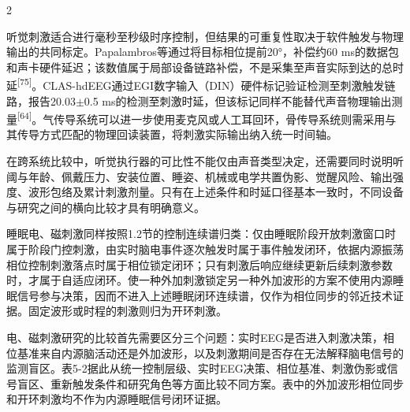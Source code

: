 \documentclass[UTF8,zihao=5,fontset=none]{ctexart}
\newcommand{\hei}{\CJKfamily{hei}}
\newcommand{\leveltwo}[1]{%
  \par\noindent{\hei\fontsize{10.5pt}{15.6pt}\selectfont\bfseries #1\par}}
\newcommand{\refcite}[1]{\nolinebreak[4]\textsuperscript{[#1]}}
\begin{document}
\begin{multicols}{2}

听觉刺激适合进行毫秒至秒级时序控制，但结果的可重复性取决于软件触发与物理输出的共同标定。Papalambros等通过将目标相位提前20°，补偿约60 ms的数据包和声卡硬件延迟；该数值属于局部设备链路补偿，不是采集至声音实际到达的总时延\refcite{75}。CLAS-hdEEG通过EGI数字输入（DIN）硬件标记验证检测至刺激触发链路，报告20.03$\pm$0.5 ms的检测至刺激时延，但该标记同样不能替代声音物理输出测量\refcite{64}。气传导系统可以进一步使用麦克风或人工耳回环，骨传导系统则需采用与其传导方式匹配的物理回读装置，将刺激实际输出纳入统一时间轴。\par

在跨系统比较中，听觉执行器的可比性不能仅由声音类型决定，还需要同时说明听阈与年龄、佩戴压力、安装位置、睡姿、机械或电学共置伪影、觉醒风险、输出强度、波形包络及累计刺激剂量。只有在上述条件和时延口径基本一致时，不同设备与研究之间的横向比较才具有明确意义。\par

\leveltwo{5.2 电刺激与磁刺激}

睡眠电、磁刺激同样按照1.2节的控制连续谱归类：仅由睡眠阶段开放刺激窗口时属于阶段门控刺激，由实时脑电事件逐次触发时属于事件触发闭环，依据内源振荡相位控制刺激落点时属于相位锁定闭环；只有刺激后响应继续更新后续刺激参数时，才属于自适应闭环。使一种外加刺激锁定另一种外加波形的方案不使用内源睡眠信号参与决策，因而不进入上述睡眠闭环连续谱，仅作为相位同步的邻近技术证据。固定波形或时程的刺激则归为开环刺激。\par

电、磁刺激研究的比较首先需要区分三个问题：实时EEG是否进入刺激决策，相位基准来自内源脑活动还是外加波形，以及刺激期间是否存在无法解释脑电信号的监测盲区。表5-2据此从统一控制层级、实时EEG决策、相位基准、刺激伪影或信号盲区、重新触发条件和研究角色等方面比较不同方案。表中的外加波形相位同步和开环刺激均不作为内源睡眠信号闭环证据。\par

\end{multicols}
\end{document}
